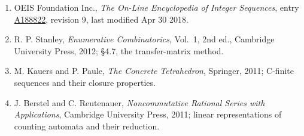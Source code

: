 \documentclass[11pt]{article}
\theoremstyle{definition}
\begin{document}
\begin{enumerate}

\item OEIS Foundation Inc., \emph{The On-Line Encyclopedia of Integer Sequences}, entry \href{https://oeis.org/A188822}{A188822}, revision 9, last modified Apr 30 2018.

\item R. P. Stanley, \emph{Enumerative Combinatorics}, Vol.~1, 2nd ed., Cambridge University Press, 2012; \S4.7, the transfer-matrix method.

\item M. Kauers and P. Paule, \emph{The Concrete Tetrahedron}, Springer, 2011; C-finite sequences and their closure properties.

\item J. Berstel and C. Reutenauer, \emph{Noncommutative Rational Series with Applications}, Cambridge University Press, 2011; linear representations of counting automata and their reduction.

\end{enumerate}
\end{document}
